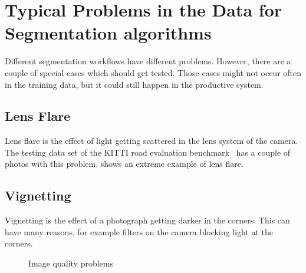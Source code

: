 \section{Typical Problems in the Data for Segmentation algorithms}

Different segmentation workflows have different problems. However, there are
a couple of special cases which should get tested. Those cases might not occur
often in the training data, but it could still happen in the productive system.

\subsection{Lens Flare}
Lens flare is the effect of light getting scattered in the lens system of the
camera. The testing data set of the KITTI road evaluation
benchmark~\cite{Fritsch2013ITSC} has a couple of photos with this problem.
 shows an extreme example of lens flare.

\subsection{Vignetting}
Vignetting is the effect of a photograph getting darker in the corners. This
can have many reasons, for example filters on the camera blocking light at the
corners.


\begin{figure}
\centering
{}%
\caption{Image quality problems}
\label{fig:test}
\end{figure}

